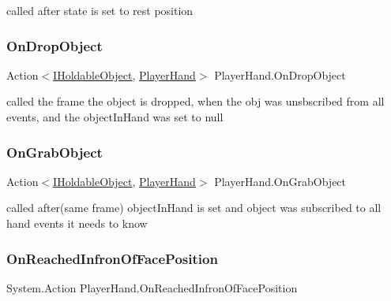 called after state is set to rest position 

\mbox{\label{class_player_hand_ac22e288fe18167393a51eec5ad0cbfc0}} 
\subsubsection{\texorpdfstring{On\+Drop\+Object}{OnDropObject}}
{\footnotesize\ttfamily Action$<$\mbox{\hyperlink{interface_i_holdable_object}{I\+Holdable\+Object}}, \mbox{\hyperlink{class_player_hand}{Player\+Hand}}$>$ Player\+Hand.\+On\+Drop\+Object}



called the frame the object is dropped, when the obj was unsbscribed from all events, and the object\+In\+Hand was set to null 

\mbox{\label{class_player_hand_af3875f350ce765612b5af99e8e9d5837}} 
\subsubsection{\texorpdfstring{On\+Grab\+Object}{OnGrabObject}}
{\footnotesize\ttfamily Action$<$\mbox{\hyperlink{interface_i_holdable_object}{I\+Holdable\+Object}}, \mbox{\hyperlink{class_player_hand}{Player\+Hand}}$>$ Player\+Hand.\+On\+Grab\+Object}



called after(same frame) object\+In\+Hand is set and object was subscribed to all hand events it needs to know 

\mbox{\label{class_player_hand_a60b8dd996d175659c87dbea8266ff095}} 
\subsubsection{\texorpdfstring{On\+Reached\+Infron\+Of\+Face\+Position}{OnReachedInfronOfFacePosition}}
{\footnotesize\ttfamily System.\+Action Player\+Hand.\+On\+Reached\+Infron\+Of\+Face\+Position}



